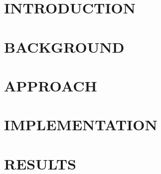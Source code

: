 \documentclass[Dual]{iitddiss}
\begin{document}
\abstract

\pagebreak


\begin{singlespace}
\tableofcontents
\thispagestyle{empty}

\listoftables
{}
\listoffigures
{}
\end{singlespace}
\pagebreak


\chapter{INTRODUCTION}
\label{chap:intro}

\pagebreak

\chapter{BACKGROUND}
\label{chap:background}

\pagebreak

\chapter{APPROACH}
\label{chap:approach}

\pagebreak

\chapter{IMPLEMENTATION}
\label{chap:implementation}

% 
\pagebreak

\chapter{RESULTS}
\label{chap:results}


\pagebreak

\end{document}
